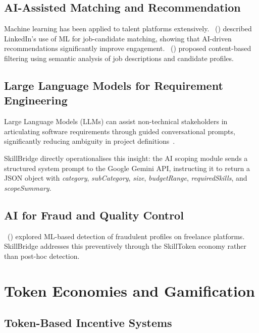 \subsection{AI-Assisted Matching and Recommendation}

Machine learning has been applied to talent platforms extensively.
\citeauthor{Kenthapadi2017}~(\citeyear{Kenthapadi2017}) described LinkedIn's use of ML for
job-candidate matching, showing that AI-driven recommendations significantly improve
engagement. \citeauthor{Almalis2015}~(\citeyear{Almalis2015}) proposed content-based
filtering using semantic analysis of job descriptions and candidate profiles.

\subsection{Large Language Models for Requirement Engineering}

\begin{infobox}
Large Language Models (LLMs) can assist non-technical stakeholders in articulating
software requirements through guided conversational prompts, significantly reducing
ambiguity in project definitions~\citep{Ahmed2023}.
\end{infobox}

SkillBridge directly operationalises this insight: the AI scoping module sends a structured
system prompt to the Google Gemini API, instructing it to return a JSON object with
\textit{category}, \textit{subCategory}, \textit{size}, \textit{budgetRange},
\textit{requiredSkills}, and \textit{scopeSummary}.

\subsection{AI for Fraud and Quality Control}

\citeauthor{Rawal2021}~(\citeyear{Rawal2021}) explored ML-based detection of fraudulent
profiles on freelance platforms. SkillBridge addresses this preventively through the
SkillToken economy rather than post-hoc detection.

\section{Token Economies and Gamification}

\subsection{Token-Based Incentive Systems}

